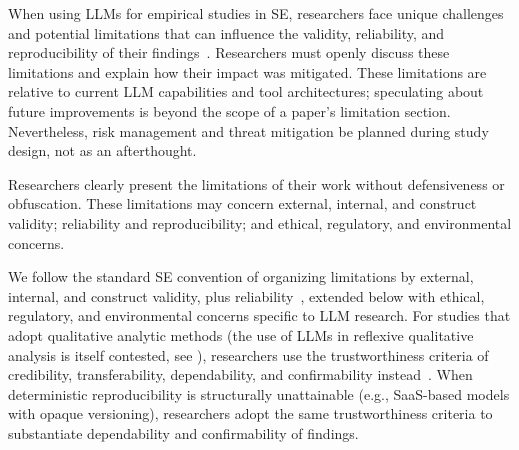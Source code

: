 
When using LLMs for empirical studies in SE, researchers face unique challenges and potential limitations that can influence the validity, reliability, and reproducibility of their findings~\cite{DBLP:conf/icse/SallouDP24}.
Researchers must openly discuss these limitations and explain how their impact was mitigated.
These limitations are relative to current LLM capabilities and tool architectures; speculating about future improvements is beyond the scope of a paper's limitation section.
Nevertheless, risk management and threat mitigation \should be planned during study design, not as an afterthought.

Researchers \must clearly present the limitations of their work without defensiveness or obfuscation. These limitations may concern external, internal, and construct validity; reliability and reproducibility; and ethical, regulatory, and environmental concerns.

We follow the standard SE convention of organizing limitations by external, internal, and construct validity, plus reliability~\cite{DBLP:journals/ese/RunesonH09,ralph2021empiricalstandardssoftwareengineering}, extended below with ethical, regulatory, and environmental concerns specific to LLM research. For studies that adopt qualitative analytic methods (the use of LLMs in reflexive qualitative analysis is itself contested, see \annotators), researchers \should use the trustworthiness criteria of credibility, transferability, dependability, and confirmability instead~\cite{guba1981criteria}. When deterministic reproducibility is structurally unattainable (e.g., SaaS-based models with opaque versioning), researchers \should adopt the same trustworthiness criteria to substantiate dependability and confirmability of findings.

